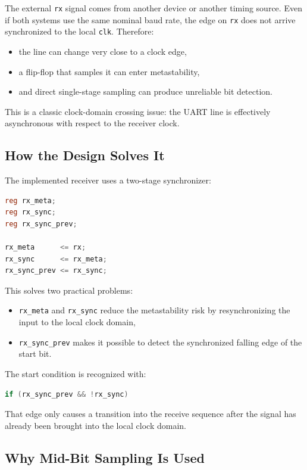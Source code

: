 \documentclass[12pt]{article}
\begin{document}
The external \texttt{rx} signal comes from another device or another timing
source. Even if both systems use the same nominal baud rate, the edge on
\texttt{rx} does not arrive synchronized to the local \texttt{clk}. Therefore:

\begin{itemize}
    \item the line can change very close to a clock edge,
    \item a flip-flop that samples it can enter metastability,
    \item and direct single-stage sampling can produce unreliable bit detection.
\end{itemize}

This is a classic clock-domain crossing issue: the UART line is effectively
asynchronous with respect to the receiver clock.

\subsection*{How the Design Solves It}

The implemented receiver uses a two-stage synchronizer:

\begin{lstlisting}[language=Verilog]
reg rx_meta;
reg rx_sync;
reg rx_sync_prev;

rx_meta      <= rx;
rx_sync      <= rx_meta;
rx_sync_prev <= rx_sync;
\end{lstlisting}

This solves two practical problems:

\begin{itemize}
    \item \texttt{rx\_meta} and \texttt{rx\_sync} reduce the metastability risk by
    resynchronizing the input to the local clock domain,
    \item \texttt{rx\_sync\_prev} makes it possible to detect the synchronized
    falling edge of the start bit.
\end{itemize}

The start condition is recognized with:

\begin{lstlisting}[language=Verilog]
if (rx_sync_prev && !rx_sync)
\end{lstlisting}

That edge only causes a transition into the receive sequence after the signal has
already been brought into the local clock domain.

\subsection*{Why Mid-Bit Sampling Is Used}
\end{document}
